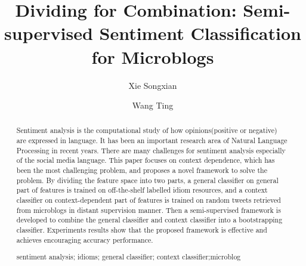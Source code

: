 \documentclass{llncs}
\newcommand{\keywords}[1]{\par\addvspace\baselineskip
\noindent\keywordname\enspace\ignorespaces#1}
\begin{document}
\mainmatter  %

\title{Dividing for Combination: Semi-supervised Sentiment Classification for Microblogs}
%
\author{Xie Songxian%
\and Wang Ting}
%

\maketitle

\begin{abstract}
Sentiment analysis is the computational study of how opinions(positive or negative) are expressed in language. It has been an important research area of Natural Language Processing in recent years.
There are many challenges for sentiment analysis especially of the social media language. 
This paper focuses on context dependence, which has been the most challenging problem, and proposes a novel framework to solve the problem.
By dividing the feature space into two parts, a general 
classifier on general part of features is trained on off-the-shelf labelled idiom resources, 
and a context classifier on context-dependent part of features is trained on random tweets retrieved from microblogs in distant supervision manner. 
Then a semi-supervised framework is developed to combine the general classifier and context classifier into a bootstrapping classifier. 
Experiments results show that the proposed framework is effective and achieves encouraging accuracy performance. 
\keywords{sentiment analysis; idioms; general classifier; context classifier;microblog}
\end{abstract}
\end{document}
